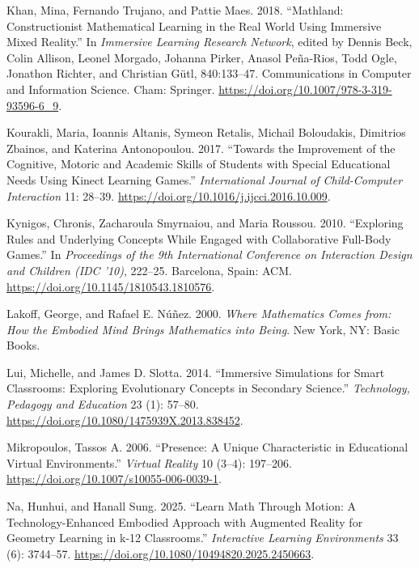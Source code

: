 \begin{CSLReferences}{1}{0}
Khan, Mina, Fernando Trujano, and Pattie Maes. 2018. {``Mathland:
Constructionist Mathematical Learning in the Real World Using Immersive
Mixed Reality.''} In \emph{Immersive Learning Research Network}, edited
by Dennis Beck, Colin Allison, Leonel Morgado, Johanna Pirker, Anasol
Peña-Rios, Todd Ogle, Jonathon Richter, and Christian Gütl, 840:133--47.
Communications in Computer and Information Science. Cham: Springer.
\url{https://doi.org/10.1007/978-3-319-93596-6_9}.

Kourakli, Maria, Ioannis Altanis, Symeon Retalis, Michail Boloudakis,
Dimitrios Zbainos, and Katerina Antonopoulou. 2017. {``Towards the
Improvement of the Cognitive, Motoric and Academic Skills of Students
with Special Educational Needs Using Kinect Learning Games.''}
\emph{International Journal of Child-Computer Interaction} 11: 28--39.
\url{https://doi.org/10.1016/j.ijcci.2016.10.009}.

Kynigos, Chronis, Zacharoula Smyrnaiou, and Maria Roussou. 2010.
{``Exploring Rules and Underlying Concepts While Engaged with
Collaborative Full-Body Games.''} In \emph{Proceedings of the 9th
International Conference on Interaction Design and Children (IDC '10)},
222--25. Barcelona, Spain: ACM.
\url{https://doi.org/10.1145/1810543.1810576}.

Lakoff, George, and Rafael E. Núñez. 2000. \emph{Where Mathematics Comes
from: How the Embodied Mind Brings Mathematics into Being}. New York,
NY: Basic Books.

Lui, Michelle, and James D. Slotta. 2014. {``Immersive Simulations for
Smart Classrooms: Exploring Evolutionary Concepts in Secondary
Science.''} \emph{Technology, Pedagogy and Education} 23 (1): 57--80.
\url{https://doi.org/10.1080/1475939X.2013.838452}.

Mikropoulos, Tassos A. 2006. {``Presence: A Unique Characteristic in
Educational Virtual Environments.''} \emph{Virtual Reality} 10 (3--4):
197--206. \url{https://doi.org/10.1007/s10055-006-0039-1}.

Na, Hunhui, and Hanall Sung. 2025. {``Learn Math Through Motion: A
Technology-Enhanced Embodied Approach with Augmented Reality for
Geometry Learning in k-12 Classrooms.''} \emph{Interactive Learning
Environments} 33 (6): 3744--57.
\url{https://doi.org/10.1080/10494820.2025.2450663}.


\end{CSLReferences}
